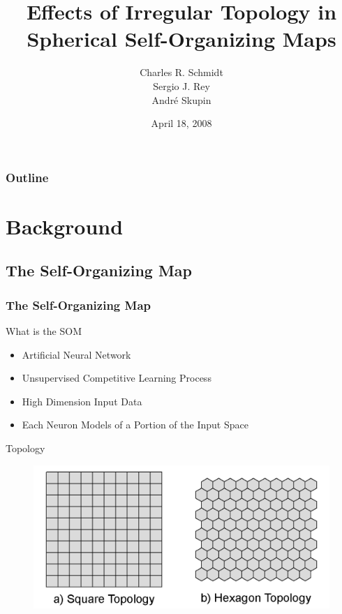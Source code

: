\documentclass[nototal,handout]{beamer}
\author[Schmidt, Rey, Skupin]{Charles R. Schmidt\\Sergio J. Rey\\Andr\'e Skupin}
\institute[SDSU]{Department of Geography\\San Diego State University}
\title[Irregular Topology in Spherical-SOM]{Effects of Irregular Topology in Spherical Self-Organizing Maps}
\subtitle{}
\date[AAG]{April 18, 2008}
\begin{document}
\begin{frame}
  \titlepage
\end{frame}
\begin{frame}
  \frametitle{Outline}
  \tableofcontents[pausesections]
\end{frame}



\section{Background} 

\subsection{The Self-Organizing Map} 

\begin{frame}
	\frametitle{The Self-Organizing Map}
 
\begin{block}{What is the SOM}
 \begin{itemize}
 \item  Artificial Neural Network
 \item  Unsupervised Competitive Learning Process
 \item  High Dimension Input Data
 \item  Each Neuron Models of a Portion of the Input Space
 \end{itemize}
 \end{block} 
\begin{block}{Topology}
  \begin{center}
  \begin{figure}
  \includegraphics[width=0.60\linewidth]{topology.png}
  \end{figure}
  \end{center}
 \end{block} \end{frame} 
\end{document}
